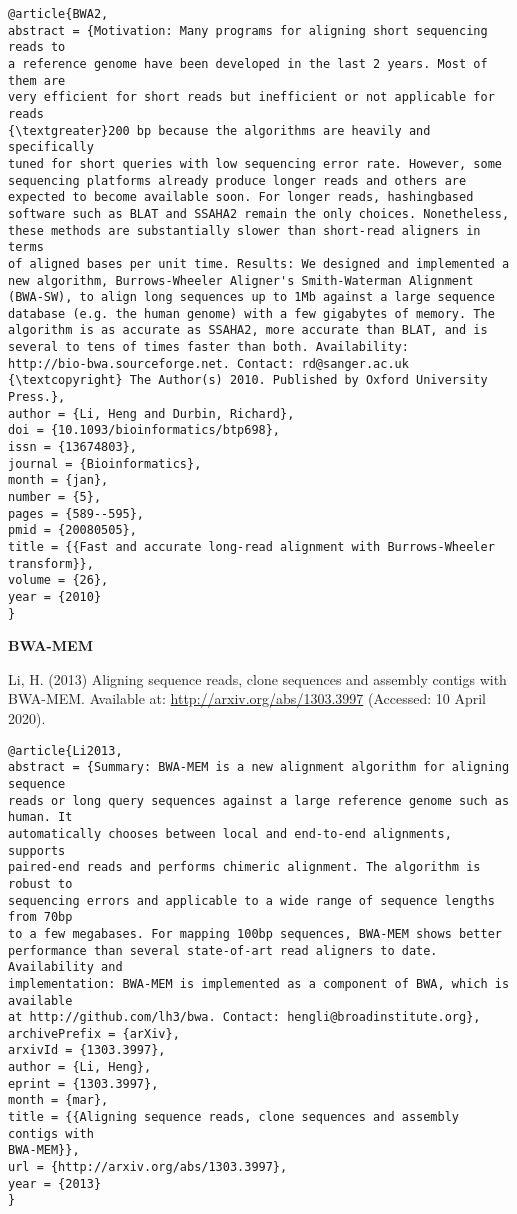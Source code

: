\documentclass[]{article}
\begin{document}
\begin{verbatim}
@article{BWA2,
abstract = {Motivation: Many programs for aligning short sequencing reads to
a reference genome have been developed in the last 2 years. Most of them are
very efficient for short reads but inefficient or not applicable for reads
{\textgreater}200 bp because the algorithms are heavily and specifically
tuned for short queries with low sequencing error rate. However, some
sequencing platforms already produce longer reads and others are
expected to become available soon. For longer reads, hashingbased
software such as BLAT and SSAHA2 remain the only choices. Nonetheless,
these methods are substantially slower than short-read aligners in terms
of aligned bases per unit time. Results: We designed and implemented a
new algorithm, Burrows-Wheeler Aligner's Smith-Waterman Alignment
(BWA-SW), to align long sequences up to 1Mb against a large sequence
database (e.g. the human genome) with a few gigabytes of memory. The
algorithm is as accurate as SSAHA2, more accurate than BLAT, and is
several to tens of times faster than both. Availability:
http://bio-bwa.sourceforge.net. Contact: rd@sanger.ac.uk
{\textcopyright} The Author(s) 2010. Published by Oxford University
Press.},
author = {Li, Heng and Durbin, Richard},
doi = {10.1093/bioinformatics/btp698},
issn = {13674803},
journal = {Bioinformatics},
month = {jan},
number = {5},
pages = {589--595},
pmid = {20080505},
title = {{Fast and accurate long-read alignment with Burrows-Wheeler transform}},
volume = {26},
year = {2010}
}
\end{verbatim}

\textbf{BWA-MEM}

Li, H. (2013) Aligning sequence reads, clone sequences and assembly contigs with BWA-MEM. Available at: \url{http://arxiv.org/abs/1303.3997} (Accessed: 10 April 2020).

\begin{verbatim}
@article{Li2013,
abstract = {Summary: BWA-MEM is a new alignment algorithm for aligning sequence
reads or long query sequences against a large reference genome such as human. It
automatically chooses between local and end-to-end alignments, supports
paired-end reads and performs chimeric alignment. The algorithm is robust to
sequencing errors and applicable to a wide range of sequence lengths from 70bp
to a few megabases. For mapping 100bp sequences, BWA-MEM shows better
performance than several state-of-art read aligners to date. Availability and
implementation: BWA-MEM is implemented as a component of BWA, which is available
at http://github.com/lh3/bwa. Contact: hengli@broadinstitute.org},
archivePrefix = {arXiv},
arxivId = {1303.3997},
author = {Li, Heng},
eprint = {1303.3997},
month = {mar},
title = {{Aligning sequence reads, clone sequences and assembly contigs with
BWA-MEM}},
url = {http://arxiv.org/abs/1303.3997},
year = {2013}
}
\end{verbatim}
\end{document}
